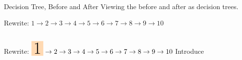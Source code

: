 \begin{frame}{Decision Tree, Before and After}
  Viewing the  before and after as decision trees.

  \medskip
  
  Rewrite: $1 \to 2\to 3\to 4\to 5\to 6\to 7\to 8\to 9\to 10$

  \medskip
  
  \begin{columns}
    \begin{column}{0.5\textwidth}
      \usebox\typecaseITEbox
    \end{column}
    \begin{column}{0.5\textwidth}  %
      \usebox\typecaseITEafterbox
    \end{column}
  \end{columns}
\end{frame}


\def\myLeftArrow{\smash{
  \begin{tikzpicture}[baseline=-2mm]
    \useasboundingbox (-2,0);
    \node[single arrow,draw=black,fill=red!10,minimum width=5cm,minimum height=7cm,shape border rotate=180] at (0,-1) {};
  \end{tikzpicture}
}}


\begin{frame}{Rewrite: $\colorbox{orange!30}{\Huge 1}\to 2\to 3\to 4\to 5\to 6\to 7\to 8\to 9\to 10$}%
  Introduce \colorbox{pink!30}{}

  \begin{columns}
    \begin{column}{0.5\textwidth}
    \end{column}
    \begin{column}{0.5\textwidth}  %
      \only<5>{\myLeftArrow\vfill}
    \end{column}    
  \end{columns}
\end{frame}

